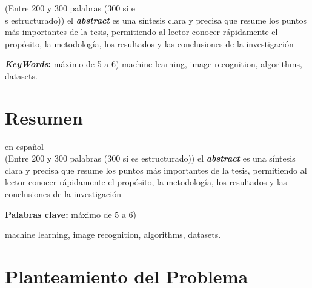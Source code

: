 \documentclass[a4paper,12pt]{article}
\begin{document}
(Entre 200 y 300 palabras (300 si e\\
s estructurado))
el \textbf{\textit{abstract}} es una síntesis clara y precisa que resume los puntos más importantes de la tesis, permitiendo al lector conocer rápidamente el propósito, la metodología, los resultados y las conclusiones de la investigación

\textbf{\textit{KeyWords}:} máximo de 5 a 6)
machine learning, image recognition, algorithms, datasets.
\section*{Resumen} en español	\\
(Entre 200 y 300 palabras (300 si es estructurado))
el \textbf{\textit{abstract}} es una síntesis clara y precisa que resume los puntos más importantes de la tesis, permitiendo al lector conocer rápidamente el propósito, la metodología, los resultados y las conclusiones de la investigación

\textbf{Palabras clave:} máximo de 5 a 6)
machine learning, image recognition, algorithms, datasets.

\section{Planteamiento del Problema}
\end{document}
